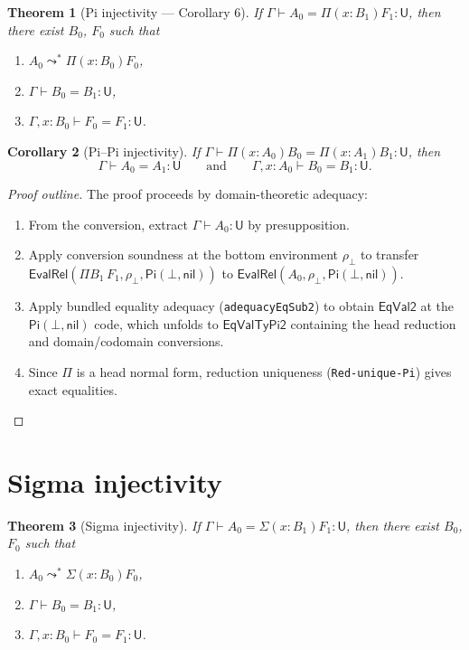 \documentclass[11pt]{article}
\newcommand{\hastype}[3]{#1 \vdash #2 : #3}
\newcommand{\conveq}[4]{#1 \vdash #2 = #3 : #4}
\newcommand{\Pitype}[2]{\Pi(#1)#2}
\newcommand{\U}{\mathsf{U}}
\newcommand{\PiC}[2]{\mathsf{Pi}(#1,#2)}
\newcommand{\Red}{\mathrel{\leadsto^*}}
\newcommand{\Sigmatype}[2]{\Sigma(#1)#2}
\newtheorem{theorem}{Theorem}
\newtheorem{corollary}[theorem]{Corollary}
\begin{document}
\begin{theorem}[Pi injectivity --- Corollary 6]
  \label{thm:pi-conv}
  If\/ $\conveq{\Gamma}{A_0}{\Pitype{x{:}B_1}{F_1}}{\U}$,
  then there exist $B_0$, $F_0$ such that
  \begin{enumerate}
    \item $A_0 \Red \Pitype{x{:}B_0}{F_0}$,
    \item $\conveq{\Gamma}{B_0}{B_1}{\U}$,
    \item $\conveq{\Gamma, x{:}B_0}{F_0}{F_1}{\U}$.
  \end{enumerate}
\end{theorem}

\begin{corollary}[Pi--Pi injectivity]
  If\/ $\conveq{\Gamma}{\Pitype{x{:}A_0}{B_0}}{\Pitype{x{:}A_1}{B_1}}{\U}$,
  then
  \[
    \conveq{\Gamma}{A_0}{A_1}{\U}
    \qquad\text{and}\qquad
    \conveq{\Gamma, x{:}A_0}{B_0}{B_1}{\U}.
  \]
\end{corollary}

\begin{proof}[Proof outline]
  The proof proceeds by domain-theoretic adequacy:
  \begin{enumerate}
    \item From the conversion, extract $\hastype{\Gamma}{A_0}{\U}$
      by presupposition.
    \item Apply conversion soundness at the bottom environment
      $\rho_\bot$ to transfer
      $\mathsf{EvalRel}(\Pi B_1\,F_1, \rho_\bot, \PiC{\bot}{\mathsf{nil}})$
      to $\mathsf{EvalRel}(A_0, \rho_\bot, \PiC{\bot}{\mathsf{nil}})$.
    \item Apply bundled equality adequacy (\texttt{adequacyEqSub2})
      to obtain $\mathsf{EqVal2}$ at the $\PiC{\bot}{\mathsf{nil}}$
      code, which unfolds to $\mathsf{EqValTyPi2}$ containing the
      head reduction and domain/codomain conversions.
    \item Since $\Pi$ is a head normal form, reduction uniqueness
      (\texttt{Red-unique-Pi}) gives exact equalities.
  \end{enumerate}
\end{proof}

\section{Sigma injectivity}

\begin{theorem}[Sigma injectivity]
  \label{thm:sigma-conv}
  If\/ $\conveq{\Gamma}{A_0}{\Sigmatype{x{:}B_1}{F_1}}{\U}$,
  then there exist $B_0$, $F_0$ such that
  \begin{enumerate}
    \item $A_0 \Red \Sigmatype{x{:}B_0}{F_0}$,
    \item $\conveq{\Gamma}{B_0}{B_1}{\U}$,
    \item $\conveq{\Gamma, x{:}B_0}{F_0}{F_1}{\U}$.
  \end{enumerate}
\end{theorem}
\end{document}
